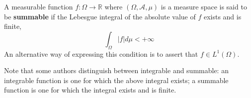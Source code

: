 \documentclass[12pt]{article}
\def\reals{\mathbb{R}}
\begin{document}
A measurable function $f : \Omega \to \reals$ where $(\Omega, \mathcal{A}, \mu)$ is a measure space is said to be {\bf summable} if the Lebesgue integral of the absolute value of $f$ exists and is finite,
\begin{equation*}
\int_{\Omega} |f| d\mu < +\infty
\end{equation*}
An alternative way of expressing this condition is to assert that $f \in L^1(\Omega)$.

Note that some authors distinguish between integrable and summable: an integrable function is one for which the above integral exists; a summable function is one for which the integral exists and is finite.
\end{document}
